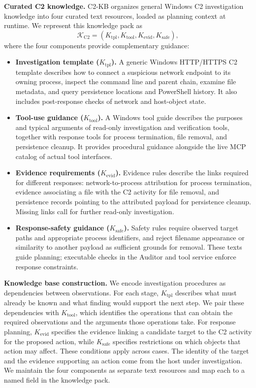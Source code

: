 \documentclass[pdflatex,sn-basic]{sn-jnl}
\begin{document}
\noindent\textbf{Curated C2 knowledge.} C2-KB organizes general Windows C2 investigation knowledge into four curated text resources, loaded as planning context at runtime. We represent this knowledge pack as
\begin{equation}
\mathcal{K}_{\mathrm{C2}} = (K_{\mathrm{tpl}},K_{\mathrm{tool}},K_{\mathrm{evid}},K_{\mathrm{safe}}),
\label{eq:c2-knowledge}
\end{equation}
where the four components provide complementary guidance:
\begin{itemize}[noitemsep, topsep=1pt, partopsep=1pt, listparindent=\parindent, leftmargin=*]
  \item \textbf{Investigation template ($K_{\mathrm{tpl}}$).} A generic Windows HTTP/HTTPS C2 template describes how to connect a suspicious network endpoint to its owning process, inspect the command line and parent chain, examine file metadata, and query persistence locations and PowerShell history. It also includes post-response checks of network and host-object state.
  \item \textbf{Tool-use guidance ($K_{\mathrm{tool}}$).} A Windows tool guide describes the purposes and typical arguments of read-only investigation and verification tools, together with response tools for process termination, file removal, and persistence cleanup. It provides procedural guidance alongside the live MCP catalog of actual tool interfaces.
  \item \textbf{Evidence requirements ($K_{\mathrm{evid}}$).} Evidence rules describe the links required for different responses: network-to-process attribution for process termination, evidence associating a file with the C2 activity for file removal, and persistence records pointing to the attributed payload for persistence cleanup. Missing links call for further read-only investigation.
  \item \textbf{Response-safety guidance ($K_{\mathrm{safe}}$).} Safety rules require observed target paths and appropriate process identifiers, and reject filename appearance or similarity to another payload as sufficient grounds for removal. These texts guide planning; executable checks in the Auditor and tool service enforce response constraints.
\end{itemize}

\noindent\textbf{Knowledge base construction.} We encode investigation procedures as dependencies between observations. For each stage, $K_{\mathrm{tpl}}$ describes what must already be known and what finding would support the next step. We pair these dependencies with $K_{\mathrm{tool}}$, which identifies the operations that can obtain the required observations and the arguments those operations take. For response planning, $K_{\mathrm{evid}}$ specifies the evidence linking a candidate target to the C2 activity for the proposed action, while $K_{\mathrm{safe}}$ specifies restrictions on which objects that action may affect. These conditions apply across cases. The identity of the target and the evidence supporting an action come from the host under investigation. We maintain the four components as separate text resources and map each to a named field in the knowledge pack.
\end{document}

